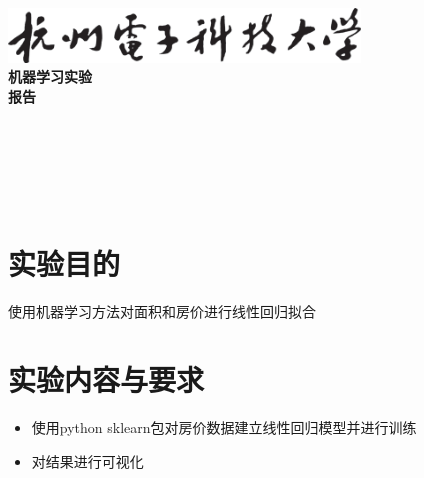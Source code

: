 \documentclass[a4paper]{ctexart}
\begin{document}
  \begin{titlepage}
      \songti
      \begin{center}
        \vspace*{2cm}
        \includegraphics[width=0.7\textwidth]{../HDU.png}\\
        \vspace*{1cm}
        {\fontsize{36pt}{0}
          \textbf{机器学习实验\\报\quad 告\\}
        }
        \vspace*{12cm}
        {\fontsize{18pt}{0}
           \underline{}\\
          \vspace*{0.5cm}
           \underline{}\\
          \vspace*{0.5cm}
           \underline{}\\
          \vspace*{0.5cm}
           \underline{}\\
          \vspace*{0.5cm}
           \underline{}\\
        }
      \end{center}
  \end{titlepage}


  \newpage
  \section{实验目的}
  使用机器学习方法对面积和房价进行线性回归拟合

  \section{实验内容与要求}
  \begin{itemize}
    \item 使用python sklearn包对房价数据建立线性回归模型并进行训练
    \item 对结果进行可视化
  \end{itemize}
\end{document}
